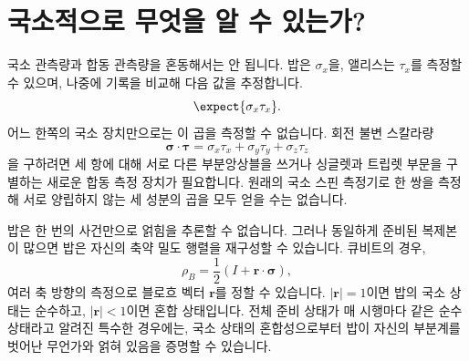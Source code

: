\begin{classroomqa}
\end{classroomqa}

\section{국소적으로 무엇을 알 수 있는가?}

국소 관측량과 합동 관측량을 혼동해서는 안 됩니다. 밥은 \(\sigma_x\)을, 앨리스는 \(\tau_x\)를 측정할 수 있으며, 나중에 기록을 비교해 다음 값을 추정합니다.
\begin{equation}
\expect{\sigma_x\tau_x}.
\end{equation}
어느 한쪽의 국소 장치만으로는 이 곱을 측정할 수 없습니다. 회전 불변 스칼라량
\begin{equation}
\boldsymbol{\sigma}\cdot\boldsymbol{\tau}
=\sigma_x\tau_x+\sigma_y\tau_y+\sigma_z\tau_z
\end{equation}
을 구하려면 세 항에 대해 서로 다른 부분앙상블을 쓰거나 싱글렛과 트립렛 부문을 구별하는 새로운 합동 측정 장치가 필요합니다. 원래의 국소 스핀 측정기로 한 쌍을 측정해 서로 양립하지 않는 세 성분의 곱을 모두 얻을 수는 없습니다.

\begin{classroomqa}
\end{classroomqa}

밥은 한 번의 사건만으로 얽힘을 추론할 수 없습니다. 그러나 동일하게 준비된 복제본이 많으면 밥은 자신의 축약 밀도 행렬을 재구성할 수 있습니다. 큐비트의 경우,
\begin{equation}
\rho_B
=\frac12\left(
I+\mathbf r\cdot\boldsymbol{\sigma}
\right),
\label{eq:l7-bloch-density}
\end{equation}
여러 축 방향의 측정으로 블로흐 벡터 \(\mathbf r\)를 정할 수 있습니다. \(|\mathbf r|=1\)이면 밥의 국소 상태는 순수하고, \(|\mathbf r|<1\)이면 혼합 상태입니다. 전체 준비 상태가 매 시행마다 같은 순수 상태라고 알려진 특수한 경우에는, 국소 상태의 혼합성으로부터 밥이 자신의 부분계를 벗어난 무언가와 얽혀 있음을 증명할 수 있습니다.


